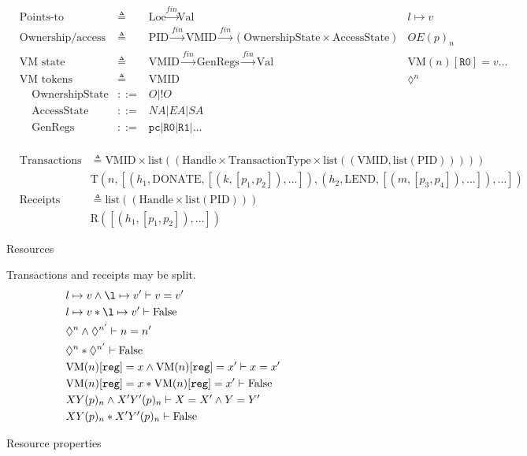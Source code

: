 \documentclass{book}
\newcommand*{\VMTOK}[1]{%
    \lozenge^{#1}
}
\newcommand*{\REG}[1]{
    \mathtt{#1}
}
\newcommand*{\defined}{\triangleq}
\newcommand*{\mapsText}[1]{\xrightarrow{#1}}
\newcommand*{\derived}{::=}
\newcommand*{\PID}{\text{PID}}
\newcommand*{\AS}{\text{AccessState}}
\newcommand*{\OS}{\text{OwnershipState}}
\newcommand*{\VMID}{\text{VMID}}
\newcommand*{\LOC}{\text{Loc}}
\newcommand*{\VAL}{\text{Val}}
\newcommand*{\GREGS}{\text{GenRegs}}
\newcommand*{\VM}{\text{VM}}
\newcommand{\False}{\text{False}}
\newcommand{\T}{\text{T}}
\newcommand{\R}{\text{R}}
\begin{document}
\begin{figure}[!htb]
  \begin{align*}
      & \text{Points-to assertions} &\defined &\LOC \mapsText{fin} \VAL &l \mapsto v \\
      & \text{Ownership/access assertions} &\defined &\PID \mapsText{fin} \VMID \mapsText{fin} (\text{OwnershipState} \times \text{AccessState}) & OE(p)_{n} \\
      & \text{VM state assertions} &\defined &\VMID \mapsText{fin} \GREGS \mapsText{fin} \VAL &\VM (n)[\REG{R0}] = v \dots \\
      & \text{VM tokens} &\defined &\VMID &\VMTOK{n} \\
      & \;\;\;\; \OS & \derived & O | !O \\
      & \;\;\;\; \AS & \derived & NA | EA | SA \\
      & \;\;\;\; \GREGS &\derived & \REG{pc} | \REG{R0} | \REG{R1} | \dots \\
  \end{align*}
  
  \begin{align*}
     & \text{Transactions} &\defined \VMID \times \text{list}((\text{Handle} \times \text{TransactionType} \times \text{list}((\VMID, \text{list}(\PID))))) \\ 
     & &\T (n, [(h_1, \text{DONATE}, [(k, [p_1, p_2]), \dots]), (h_2, \text{LEND}, [(m, [p_3, p_4]), \dots]), \dots]) \\
     & \text{Receipts} &\defined \text{list}((\text{Handle} \times \text{list}(\PID))) \\
     & &\R ([(h_1, [p_1, p_2]), \dots])
  \end{align*}
  \caption{Resources}
\end{figure}

\begin{figure}[!hbt]
  \hspace{15cm} Transactions and receipts may be split.
  \begin{align*}
      & l \mapsto v \land \l \mapsto v' \vdash v = v' \\
      & l \mapsto v * \l \mapsto v' \vdash \False \\
      & \VMTOK{n} \land \VMTOK{n'} \vdash n = n' \\
      & \VMTOK{n} * \VMTOK{n'} \vdash \False \\
      & \VM (n) [\REG{reg}] = x \land \VM (n) [\REG{reg}] = x' \vdash x = x' \\
      & \VM (n) [\REG{reg}] = x * \VM (n) [\REG{reg}] = x' \vdash \False \\
      & XY (p)_{n} \land X'Y' (p)_{n} \vdash X = X' \land Y = Y' \\
      & XY (p)_{n} * X'Y' (p)_{n} \vdash \False
  \end{align*}
  \caption{Resource properties}
\end{figure}
\end{document}

